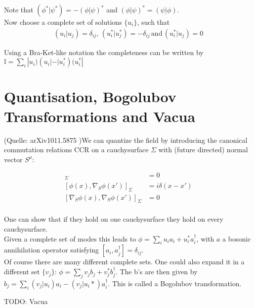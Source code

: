 Note that \((\phi^*|\psi^*) = -(\phi|\psi)^*\) and \((\phi|\psi)^* = (\psi|\phi)\).\\

Now choose a complete set of solutions $\{u_i\}$, such that
\begin{align*}
(u_i| u_j) = \delta_{ij},\,(u_i^*| u_j^*) = -\delta_{ij}\,\text{and}\,(u_i^*| u_j) = 0
\end{align*}

Using a Bra-Ket-like notation the completeness can be written by \(\mathbb{I} = \sum_i |u_i)(u_i| - |u_i^*)(u_i^*|\)

\section{Quantisation, Bogolubov Transformations and Vacua}

(Quelle: arXiv1011.5875 )We can quantize the field by introducing the canonical commutation relations CCR on a cauchysurface \(\Sigma\) with (future directed) normal vector $S^\mu$:

\begin{align*}
[\phi(x),\phi(x')]_\Sigma &= 0\\
[\phi(x),\nabla_S \phi(x')]_\Sigma &= i\delta(x-x')\\
[\nabla_S \phi(x),\nabla_S \phi(x')]_\Sigma &= 0\\
\end{align*}

One can show that if they hold on one cauchysurface they hold on every cauchysurface.\\
Given a complete set of modes this leads to \(\phi = \sum_i u_i a_i + u_i^* a_i^\dagger\), with \(a\) a bosonic annihilation operator satisfying \([a_i,a_j^\dagger] = \delta_{ij}\).\\

Of course there are many different complete sets. One could also expand it in a different set \(\{v_j\}\): \(\phi = \sum_j v_j b_j + v_j^* b_j^\dagger\). The b's are then given by \(b_j = \sum_i (v_j|u_i) a_i - (v_j|u_i*) a_i^\dagger\). This is called a Bogolubov transformation. 

TODO: Vacua

